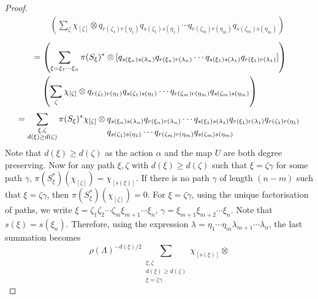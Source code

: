 \documentclass{amsart}
\theoremstyle{plain}
\theoremstyle{definition}
\theoremstyle{remark}
\numberwithin{equation}{section}
\begin{document}
\begin{proof}
\begin{equation*}
\begin{aligned}
&\;\;\;\;\left(\sum\limits_{\zeta}\chi_{[\zeta]}\otimes q_{r(\zeta_{1})r(\eta_{1})}q_{s(\zeta_{1})s(\eta_{1})}\cdots q_{r(\zeta_{m})r(\eta_{m})}q_{s(\zeta_{m})s(\eta_{m})}\right)
    \end{aligned}
\end{equation*}
\begin{equation*}\hfill
    \begin{aligned}
&=\left(\sum\limits_{\substack{\xi=\xi_{1}\cdots\xi_{n}}}\pi(S_{\xi})^{\ast}\otimes [q_{s(\xi_{n})s(\lambda_{n})}q_{r(\xi_{n})r(\lambda_{n})}\cdots  q_{s(\xi_{1})s(\lambda_{1})}q_{r(\xi_{1})r(\lambda_{1})}] \right)\\
&\;\;\;\;\left(\sum\limits_{\zeta}\chi_{[\zeta]}\otimes q_{r(\zeta_{1})r(\eta_{1})}q_{s(\zeta_{1})s(\eta_{1})}\cdots q_{r(\zeta_{m})r(\eta_{m})}q_{s(\zeta_{m})s(\eta_{m})}\right)
\\
\end{aligned}
\end{equation*} 
\begin{equation*}\hfill
    =\sum\limits_{\substack{\xi,\zeta\\ d(\xi)\geq d(\zeta)}}\pi(S_{\xi})^{*}\chi_{[\zeta]}\otimes 
\begin{aligned}[t]
&q_{s(\xi_{n})s(\lambda_{n})}q_{r(\xi_{n})r(\lambda_{n})}\cdots  q_{s(\xi_{1})s(\lambda_{1})}q_{r(\xi_{1})r(\lambda_{1})}q_{r(\zeta_{1})r(\eta_{1})}\\
&q_{s(\zeta_{1})s(\eta_{1})}\cdots q_{r(\zeta_{m})r(\eta_{m})}q_{s(\zeta_{m})s(\eta_{m})}
\end{aligned}
\end{equation*}
Note that $d(\xi)\geq d(\zeta)$ as the action $\alpha$ and the map $U$ are both degree preserving. Now for any path $\xi,\zeta$ with $d(\xi)\geq d(\zeta)$ such that $\xi=\zeta\gamma$ for some path $\gamma$, $\pi(S_{\xi}^{\ast})(\chi_{[\zeta]})=\chi_{[s(\xi)]}$. If there is no path $\gamma$ of length $(n-m)$ such that $\xi=\zeta\gamma$, then $\pi(S_{\xi}^{\ast})(\chi_{[\zeta]})=0$. For $\xi=\zeta\gamma$, using the unique factorisation of paths, we write $\xi=\zeta_{1}\zeta_{2}\cdots \zeta_{m}\xi_{m+1}\cdots \xi_{n}$, $\gamma=\xi_{m+1}\xi_{m+2}\cdots \xi_{n}$. Note that $s(\xi)=s(\xi_{n})$. Therefore, using the expression $\lambda=\eta_{1}\cdots \eta_{m}\lambda_{m+1}\cdots\lambda_{n}$, the last summation becomes
\begin{equation*}
    \rho(\Lambda)^{-d(\xi)/2}\sum\limits_{\substack{\xi,\zeta\\ d(\xi)\geq d(\zeta) \\ \xi=\zeta\gamma}}\chi_{[s(\xi)]}\otimes 

\end{equation*}
\end{proof}
\end{document}
